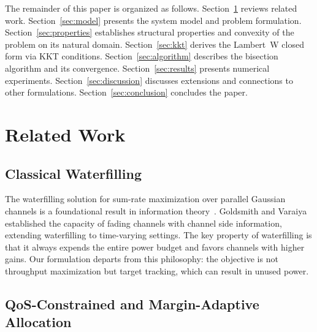 \documentclass[journal]{IEEEtran}
\begin{document}
The remainder of this paper is organized as follows.
Section~\ref{sec:related} reviews related work.
Section~\ref{sec:model} presents the system model and problem formulation.
Section~\ref{sec:properties} establishes structural properties and convexity of the problem on its natural domain.
Section~\ref{sec:kkt} derives the Lambert~W closed form via KKT conditions.
Section~\ref{sec:algorithm} describes the bisection algorithm and its convergence.
Section~\ref{sec:results} presents numerical experiments.
Section~\ref{sec:discussion} discusses extensions and connections to other formulations.
Section~\ref{sec:conclusion} concludes the paper.

\section{Related Work}
\label{sec:related}

\subsection{Classical Waterfilling}

The waterfilling solution for sum-rate maximization over parallel Gaussian channels is a foundational result in information theory~\cite{coverandthomas2006,tse2005fundamentals}.
Goldsmith and Varaiya~\cite{goldsmithvaraiya1997} established the capacity of fading channels with channel side information, extending waterfilling to time-varying settings.
The key property of waterfilling is that it always expends the entire power budget and favors channels with higher gains.
Our formulation departs from this philosophy: the objective is not throughput maximization but target tracking, which can result in unused power.

\subsection{QoS-Constrained and Margin-Adaptive Allocation}
\end{document}
